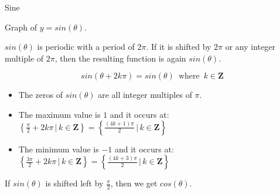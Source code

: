 \documentclass{ximera}
\begin{document}
\begin{example} Sine



Graph of $y = sin(\theta)$.

\begin{image}
\end{image}



$sin(\theta)$ is periodic with a period of $2\pi$.  If it is shifted by $2\pi$ or any integer multiple of $2\pi$, then the resulting function is again $sin(\theta)$.


\[    sin(\theta + 2k\pi) = sin(\theta)   \,   \text{ where }  \,  k \in \textbf{Z}       \]



\begin{itemize}
\item The zeros of $sin(\theta)$ are all integer multiples of $\pi$.
\item The maximum value is $1$ and it occurs at:  $\left\{     \frac{\pi}{2} + 2k\pi \, | \, k \in \textbf{Z}     \right\} = \left\{     \frac{(4k+1)\pi}{2} \, | \, k \in \textbf{Z}     \right\}$
\item The minimum value is $-1$ and it occurs at:  $\left\{    \frac{3\pi}{2} + 2k\pi \, | \, k \in \textbf{Z}     \right\} = \left\{    \frac{(4k+3)\pi}{2} \, | \, k \in \textbf{Z}     \right\}$
\end{itemize}


If $sin(\theta)$ is shifted left by $\frac{\pi}{2}$, then we get $cos(\theta)$.



\end{example}
\end{document}
